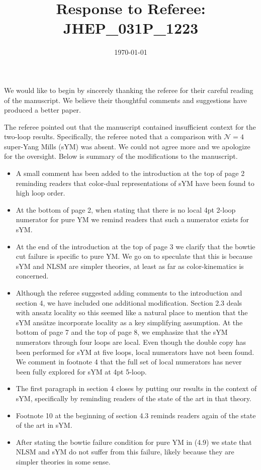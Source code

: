 \documentclass[notitlepage, 12pt]{revtex4-1}
\begin{document}
\title{Response to Referee: JHEP\_031P\_1223}

\date{\today}

\maketitle

We would like to begin by sincerely thanking the referee for their careful reading of the manuscript.
We believe their thoughtful comments and suggestions have produced a better paper.

The referee pointed out that the manuscript contained insufficient context for the two-loop results.
Specifically, the referee noted that a comparison with $\mathcal{N}=4$ super-Yang Mills (sYM) was absent.
We could not agree more and we apologize for the oversight.
Below is summary of the modifications to the manuscript.
\begin{itemize}
\item A small comment has been added to the introduction at the top of page 2 reminding readers that color-dual representations of sYM have been found to high loop order.
\item At the bottom of page 2, when stating that there is no local 4pt 2-loop numerator for pure YM we remind readers that such a numerator exists for sYM.
\item At the end of the introduction at the top of page 3 we clarify that the bowtie cut failure is specific to pure YM.
We go on to speculate that this is because sYM and NLSM are simpler theories, at least as far as color-kinematics is concerned.
\item Although the referee suggested adding comments to the introduction and section 4, we have included one additional modification.
Section 2.3 deals with ansatz locality so this seemed like a natural place to mention that the sYM ans\"atze incorporate locality as a key simplifying assumption.
At the bottom of page 7 and the top of page 8, we emphasize that the sYM numerators through four loops are local.
Even though the double copy has been performed for sYM at five loops, local numerators have not been found.
We comment in footnote 4 that the full set of local numerators has never been fully explored for sYM at 4pt 5-loop.
\item The first paragraph in section 4 closes by putting our results in the context of sYM, specifically by reminding readers of the state of the art in that theory.
\item Footnote 10 at the beginning of section 4.3 reminds readers again of the state of the art in sYM.
\item After stating the bowtie failure condition for pure YM in (4.9) we state that NLSM and sYM do not suffer from this failure, likely because they are simpler theories in some sense.
\end{itemize}
\end{document}
